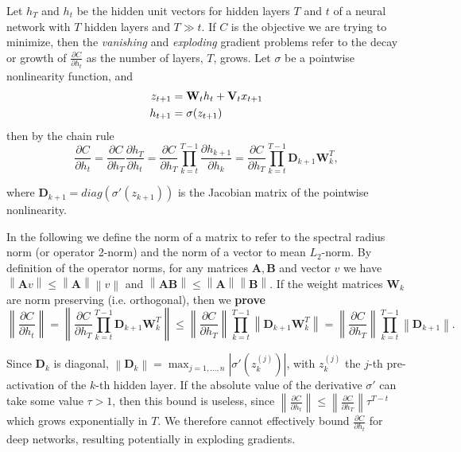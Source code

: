 \documentclass{article} %
\newcommand{\matr}[1]{\mathbf{#1}}
\newcommand\norm[1]{\left\lVert#1\right\rVert}
\begin{document}
Let $h_T$ and $h_t$ be the hidden unit vectors for hidden layers $T$ and $t$ of a neural network with 
$T$ hidden layers and $T \gg t$. 
If $C$ is the objective we are trying to minimize, then the {\it{vanishing}} and {\it{exploding}} 
gradient problems refer to the decay or growth of $\frac{\partial C}{\partial h_t}$ as the 
number of layers, $T$, grows. Let $\sigma$ be a pointwise nonlinearity function, and
\begin{align}
  z_{t+1} &= \matr{W}_t h_t + \matr{V}_t x_{t+1}  \notag \\
  h_{t+1} &= \sigma (z_{t+1})
\label{nonlinoutput}
\end{align}
then by the chain rule
\begin{equation}
  \frac{\partial C}{\partial h_t} = \frac{\partial C}{\partial h_T} \frac{\partial h_T}{\partial h_t} 
  = \frac{\partial C}{\partial h_T} \prod_{k=t}^{T-1} \frac{\partial h_{k+1}}{\partial h_k} 
  = \frac{\partial C}{\partial h_T} \prod_{k=t}^{T-1} \matr{D}_{k+1} \matr{W}_k^T ,
\end{equation}

where $\matr{D}_{k+1} = diag(\sigma'(z_{k+1}))$ is the Jacobian matrix of the pointwise nonlinearity.

In the following we define the norm of a matrix to refer to the spectral radius norm (or operator 2-norm)
and the norm of a vector to mean $L_2$-norm. By definition of the operator norms, 
for any matrices $\matr{A}, \matr{B}$ and vector $v$ we have $\norm{\matr{A}v} \leq \norm{\matr{A}} \norm{v}$ and $\norm{\matr{A}\matr{B}} \leq \norm{\matr{A}} \norm{\matr{B}}$.
If the weight matrices $\matr{W}_k$ are norm preserving (i.e. orthogonal), then we {\bf{prove}}
\begin{equation}
  \norm{ \frac{\partial C}{\partial h_t} } = \norm{ \frac{\partial C}{\partial h_T} 
  \prod_{k=t}^{T-1} \matr{D}_{k+1} \matr{W}_k^T } \leq \norm{\frac{\partial C}{\partial h_T}} 
  \prod_{k=t}^{T-1} \norm{ \matr{D}_{k+1} \matr{W}_k^T } 
  = \norm{ \frac{\partial C}{\partial h_T}} \prod_{k=t}^{T-1} \norm{\matr{D}_{k+1}} .
\label{bound}
\end{equation}

Since $\matr{D}_k$ is diagonal, $\norm{\matr{D}_k} = \max_{j=1, ..., n} |\sigma'(z_k^{(j)})|$,
with $z_k^{(j)}$ the $j$-th pre-activation of the $k$-th hidden layer.
If the absolute value of the derivative $\sigma'$ can take some value $\tau > 1$, then 
this bound is useless, since $\norm{\frac{\partial C}{\partial h_t}} 
\leq \norm{\frac{\partial C}{\partial h_T}} \tau^{T-t}$ which grows exponentially 
in $T$. We therefore cannot effectively bound $\frac{\partial C}{\partial h_t}$ 
for deep networks, resulting potentially in exploding gradients.
\end{document}
